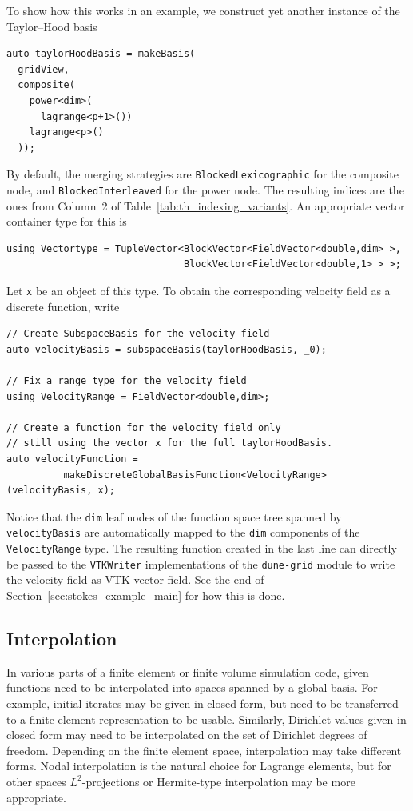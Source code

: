 \documentclass[a4paper,10pt,headings=normal,bibliography=totoc]{scrartcl}
\newcommand{\cpp}[1]{\lstinline[basicstyle=\ttfamily]!#1!}
\newcommand{\dunemodule}[1]{\texttt{#1}}
\begin{document}
To show how this works in an example, we construct yet another instance of the
Taylor--Hood basis
%
\begin{lstlisting}[style=Example]
auto taylorHoodBasis = makeBasis(
  gridView,
  composite(
    power<dim>(
      lagrange<p+1>())
    lagrange<p>()
  ));
\end{lstlisting}
By default, the merging strategies are \cpp{BlockedLexicographic} for the composite node,
and \cpp{BlockedInterleaved} for the power node.  The resulting indices are the ones
from Column~2 of Table~\ref{tab:th_indexing_variants}.  An appropriate vector container
type for this is
\begin{lstlisting}[style=Example]
using Vectortype = TupleVector<BlockVector<FieldVector<double,dim> >,
                               BlockVector<FieldVector<double,1> > >;
\end{lstlisting}
Let \cpp{x} be an object of this type.  To obtain the corresponding velocity field
as a discrete function, write
%
\begin{lstlisting}[style=Example]
// Create SubspaceBasis for the velocity field
auto velocityBasis = subspaceBasis(taylorHoodBasis, _0);

// Fix a range type for the velocity field
using VelocityRange = FieldVector<double,dim>;

// Create a function for the velocity field only
// still using the vector x for the full taylorHoodBasis.
auto velocityFunction =
          makeDiscreteGlobalBasisFunction<VelocityRange>(velocityBasis, x);
\end{lstlisting}

Notice that the \cpp{dim} leaf nodes of the function space
tree spanned by \cpp{velocityBasis} are automatically mapped to the
\cpp{dim} components of the \cpp{VelocityRange} type.
The resulting function created in the last line can directly
be passed to the \cpp{VTKWriter} implementations of the
\dunemodule{dune-grid} module to write the velocity field
as VTK vector field.
See the end of Section~\ref{sec:stokes_example_main}
for how this is done.



\subsection{Interpolation}

In various parts of a finite element or finite volume simulation code, given functions need to be interpolated
into spaces spanned by a global basis.  For example, initial iterates may be given in closed form, but need to be
transferred to a finite element representation to be usable.  Similarly, Dirichlet values given in closed form
may need to be interpolated on the set of Dirichlet degrees of freedom.  Depending on the finite element space,
interpolation may take different forms.  Nodal interpolation is the natural choice for Lagrange elements, but
for other spaces $L^2$-projections or Hermite-type interpolation may be more appropriate.
\end{document}
